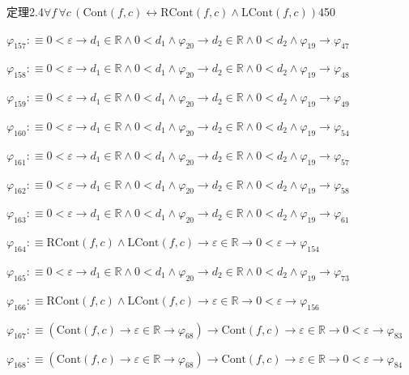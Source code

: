 \begin{fullproof}{定理2.4}{$\forall f\,\forall c\,(\mathrm{Cont}(f,c) \leftrightarrow \mathrm{RCont}(f,c) \land \mathrm{LCont}(f,c))$}{450}
\begin{abbrevlist}
\item $\varphi_{157} :\equiv 0 < \varepsilon \to d_{1} \in \mathbb{R} \land 0 < d_{1} \land \varphi_{20} \to d_{2} \in \mathbb{R} \land 0 < d_{2} \land \varphi_{19} \to \varphi_{47}$
\item $\varphi_{158} :\equiv 0 < \varepsilon \to d_{1} \in \mathbb{R} \land 0 < d_{1} \land \varphi_{20} \to d_{2} \in \mathbb{R} \land 0 < d_{2} \land \varphi_{19} \to \varphi_{48}$
\item $\varphi_{159} :\equiv 0 < \varepsilon \to d_{1} \in \mathbb{R} \land 0 < d_{1} \land \varphi_{20} \to d_{2} \in \mathbb{R} \land 0 < d_{2} \land \varphi_{19} \to \varphi_{49}$
\item $\varphi_{160} :\equiv 0 < \varepsilon \to d_{1} \in \mathbb{R} \land 0 < d_{1} \land \varphi_{20} \to d_{2} \in \mathbb{R} \land 0 < d_{2} \land \varphi_{19} \to \varphi_{54}$
\item $\varphi_{161} :\equiv 0 < \varepsilon \to d_{1} \in \mathbb{R} \land 0 < d_{1} \land \varphi_{20} \to d_{2} \in \mathbb{R} \land 0 < d_{2} \land \varphi_{19} \to \varphi_{57}$
\item $\varphi_{162} :\equiv 0 < \varepsilon \to d_{1} \in \mathbb{R} \land 0 < d_{1} \land \varphi_{20} \to d_{2} \in \mathbb{R} \land 0 < d_{2} \land \varphi_{19} \to \varphi_{58}$
\item $\varphi_{163} :\equiv 0 < \varepsilon \to d_{1} \in \mathbb{R} \land 0 < d_{1} \land \varphi_{20} \to d_{2} \in \mathbb{R} \land 0 < d_{2} \land \varphi_{19} \to \varphi_{61}$
\item $\varphi_{164} :\equiv \mathrm{RCont}(f,c) \land \mathrm{LCont}(f,c) \to \varepsilon \in \mathbb{R} \to 0 < \varepsilon \to \varphi_{154}$
\item $\varphi_{165} :\equiv 0 < \varepsilon \to d_{1} \in \mathbb{R} \land 0 < d_{1} \land \varphi_{20} \to d_{2} \in \mathbb{R} \land 0 < d_{2} \land \varphi_{19} \to \varphi_{73}$
\item $\varphi_{166} :\equiv \mathrm{RCont}(f,c) \land \mathrm{LCont}(f,c) \to \varepsilon \in \mathbb{R} \to 0 < \varepsilon \to \varphi_{156}$
\item $\varphi_{167} :\equiv (\mathrm{Cont}(f,c) \to \varepsilon \in \mathbb{R} \to \varphi_{68}) \to \mathrm{Cont}(f,c) \to \varepsilon \in \mathbb{R} \to 0 < \varepsilon \to \varphi_{83}$
\item $\varphi_{168} :\equiv (\mathrm{Cont}(f,c) \to \varepsilon \in \mathbb{R} \to \varphi_{68}) \to \mathrm{Cont}(f,c) \to \varepsilon \in \mathbb{R} \to 0 < \varepsilon \to \varphi_{84}$

\end{abbrevlist}
\end{fullproof}
